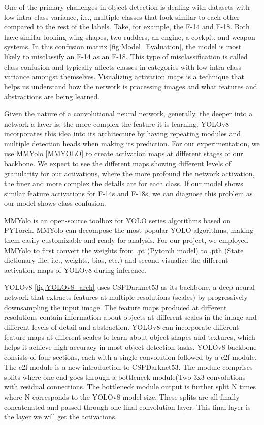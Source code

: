 \documentclass[10pt,twocolumn,letterpaper]{article}
\begin{document}
One of the primary challenges in object detection is dealing with datasets with low intra-class variance, i.e., multiple classes that look similar to each other compared to the rest of the labels. Take, for example, the F-14 and F-18. Both have similar-looking wing shapes, two rudders, an engine, a cockpit, and weapon systems. In this confusion matrix \ref{fig:Model_Evaluation}, the model is most likely to misclassify an F-14 as an F-18. This type of misclassification is called class confusion and typically affects classes in categories with low intra-class variance amongst themselves. Visualizing activation maps is a technique that helps us understand how the network is processing images and what features and abstractions are being learned. 

Given the nature of a convolutional neural network, generally, the deeper into a network a layer is, the more complex the feature it is learning. YOLOv8 incorporates this idea into its architecture by having repeating modules and multiple detection heads when making its prediction. For our experimentation, we use MMYolo \ref{MMYOLO} to create activation maps at different stages of our backbone. We expect to see the different maps showing different levels of granularity for our activations, where the more profound the network activation, the finer and more complex the details are for each class. If our model shows similar feature activations for F-14s and F-18s, we can diagnose this problem as our model shows class confusion.

MMYolo is an open-source toolbox for YOLO series algorithms based on PYTorch. MMYolo can decompose the most popular YOLO algorithms, making them easily customizable and ready for analysis. For our project, we employed MMYolo to first convert the weights from .pt (Pytorch model) to .pth (State dictionary file, i.e., weights, bias, etc.) and second visualize the different activation maps of YOLOv8 during inference.

YOLOv8 \ref{fig:YOLOv8_arch} uses CSPDarknet53 as its backbone, a deep neural network that extracts features at multiple resolutions (scales) by progressively downsampling the input image. The feature maps produced at different resolutions contain information about objects at different scales in the image and different levels of detail and abstraction. YOLOv8 can incorporate different feature maps at different scales to learn about object shapes and textures, which helps it achieve high accuracy in most object detection tasks. YOLOv8 backbone consists of four sections, each with a single convolution followed by a c2f module. The c2f module is a new introduction to CSPDarknet53. The module comprises splits where one end goes through a bottleneck module(Two 3x3 convolutions with residual connections. The bottleneck module output is further split N times where N corresponds to the YOLOv8 model size. These splits are all finally concatenated and passed through one final convolution layer. This final layer is the layer we will get the activations.
\end{document}
